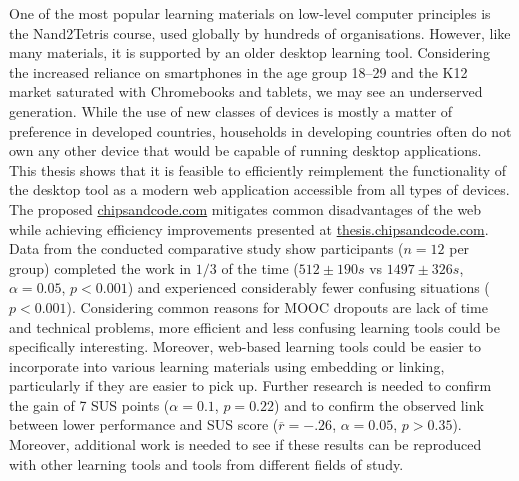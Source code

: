 One of the most popular learning materials on low-level computer principles is the Nand2Tetris course, used globally by hundreds of organisations.
However, like many materials, it is supported by an older desktop learning tool.
Considering the increased reliance on smartphones in the age group 18--29 and the K12 market saturated with Chromebooks and tablets, we may see an underserved generation.
While the use of new classes of devices is mostly a matter of preference in developed countries, households in developing countries often do not own any other device that would be capable of running desktop applications.
This thesis shows that it is feasible to efficiently reimplement the functionality of the desktop tool as a modern web application accessible from all types of devices.
The proposed \href{https://chipsandcode.com}{chipsandcode.com} mitigates common disadvantages of the web while achieving efficiency improvements presented at \href{https://thesis.chipsandcode.com}{thesis.chipsandcode.com}.
Data from the conducted comparative study show participants ($n=12$ per group) completed the work in $1/3$ of the time ($512 \pm190 s$ vs $1497 \pm326 s$, $\alpha=0.05$, $p<0.001$) and experienced considerably fewer confusing situations ($p<0.001$).
Considering common reasons for MOOC dropouts are lack of time and technical problems, more efficient and less confusing learning tools could be specifically interesting.
Moreover, web-based learning tools could be easier to incorporate into various learning materials using embedding or linking, particularly if they are easier to pick up.
Further research is needed to confirm the gain of 7 SUS points ($\alpha=0.1$, $p=0.22$) and to confirm the observed link between lower performance and SUS score ($\overline{r}=-.26$, $\alpha=0.05$, $p > 0.35$).
Moreover, additional work is needed to see if these results can be reproduced with other learning tools and tools from different fields of study.

\cleardoublepage
\rhead{\nouppercase{\rightmark}}

\setcounter{page}{1}
